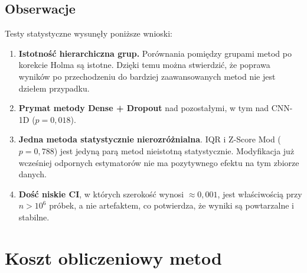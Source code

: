 \documentclass[a4paper,twoside,12pt]{book}
\begin{document}
	\subsection{Obserwacje}
	
	Testy statystyczne wysunęły poniższe wnioski:
	
	\begin{enumerate}
		\item \textbf{Istotność hierarchiczna grup.} Porównania pomiędzy grupami metod po korekcie Holma są istotne. Dzięki temu można stwierdzić, że poprawa wyników po przechodzeniu do bardziej zaawansowanych metod nie jest dziełem przypadku.
		\item \textbf{Prymat metody Dense + Dropout} nad pozostałymi, w tym nad CNN-1D ($p = 0{,}018$).
		\item \textbf{Jedna metoda statystycznie nierozróżnialna}. IQR i Z-Score Mod ($p = 0{,}788$) jest jedyną parą metod nieistotną statystycznie. Modyfikacja już wcześniej odpornych estymatorów nie ma pozytywnego efektu na tym zbiorze danych.
		\item \textbf{Dość niskie CI}, w których szerokość wynosi $\approx 0{,}001$, jest właściwością przy $n > 10^6$ próbek, a nie artefaktem, co potwierdza, że wyniki są powtarzalne i stabilne.
	\end{enumerate}
	
	\newpage	
	\section{Koszt obliczeniowy metod}
	
\end{document}
